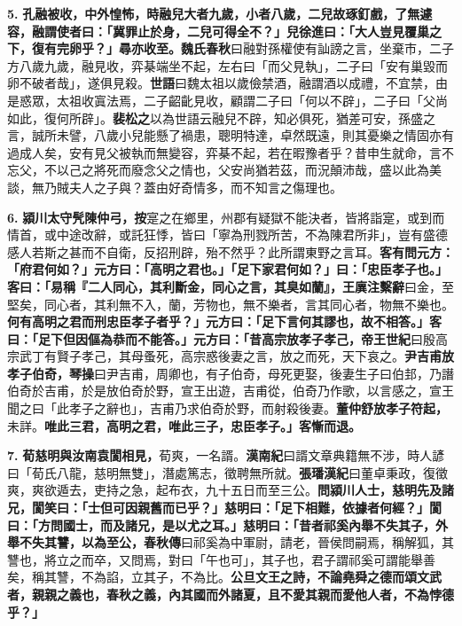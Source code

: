 \textbf{5.} \textbf{孔融被收，中外惶怖，時融兒大者九歲，小者八歲，二兒故琢釘戲，了無遽容，融謂使者曰：「冀罪止於身，二兒可得全不？」兒徐進曰：「大人豈見覆巢之下，復有完卵乎？」尋亦收至。}{\footnotesize \textbf{魏氏春秋}曰融對孫權使有訕謗之言，坐棄市，二子方八歲九歲，融見收，弈棊端坐不起，左右曰「而父見執」，二子曰「安有巢毀而卵不破者哉」，遂俱見殺。\textbf{世語}曰魏太祖以歲儉禁酒，融謂酒以成禮，不宜禁，由是惑眾，太祖收寘法焉，二子齠齔見收，顧謂二子曰「何以不辟」，二子曰「父尚如此，復何所辟」。\textbf{裴松之}以為世語云融兒不辟，知必俱死，猶差可安，孫盛之言，誠所未譬，八歲小兒能懸了禍患，聰明特達，卓然既遠，則其憂樂之情固亦有過成人矣，安有見父被執而無變容，弈棊不起，若在暇豫者乎？昔申生就命，言不忘父，不以己之將死而廢念父之情也，父安尚猶若茲，而況顛沛哉，盛以此為美談，無乃賊夫人之子與？蓋由好奇情多，而不知言之傷理也。}

\textbf{6.} \textbf{潁川太守髠陳仲弓，}{\footnotesize \textbf{按}寔之在鄉里，州郡有疑獄不能決者，皆將詣寔，或到而情首，或中途改辭，或託狂悸，皆曰「寧為刑戮所苦，不為陳君所非」，豈有盛德感人若斯之甚而不自衛，反招刑辟，殆不然乎？此所謂東野之言耳。}\textbf{客有問元方：「府君何如？」元方曰：「高明之君也。」「足下家君何如？」曰：「忠臣孝子也。」客曰：「易稱『二人同心，其利斷金，同心之言，其臭如蘭』，}{\footnotesize \textbf{王廙注繫辭}曰金，至堅矣，同心者，其利無不入，蘭，芳物也，無不樂者，言其同心者，物無不樂也。}\textbf{何有高明之君而刑忠臣孝子者乎？」元方曰：「足下言何其謬也，故不相答。」客曰：「足下但因傴為恭而不能答。」元方曰：「昔高宗放孝子孝己，}{\footnotesize \textbf{帝王世紀}曰殷高宗武丁有賢子孝己，其母蚤死，高宗惑後妻之言，放之而死，天下哀之。}\textbf{尹吉甫放孝子伯奇，}{\footnotesize \textbf{琴操}曰尹吉甫，周卿也，有子伯奇，母死更娶，後妻生子曰伯邽，乃譖伯奇於吉甫，於是放伯奇於野，宣王出遊，吉甫從，伯奇乃作歌，以言感之，宣王聞之曰「此孝子之辭也」，吉甫乃求伯奇於野，而射殺後妻。}\textbf{董仲舒放孝子符起，}{\footnotesize 未詳。}\textbf{唯此三君，高明之君，唯此三子，忠臣孝子。」客慚而退。}

\textbf{7.} \textbf{荀慈明與汝南袁閬相見，}{\footnotesize 荀爽，一名諝。\textbf{漢南紀}曰諝文章典籍無不涉，時人諺曰「荀氏八龍，慈明無雙」，潛處篤志，徵聘無所就。\textbf{張璠漢紀}曰董卓秉政，復徵爽，爽欲遁去，吏持之急，起布衣，九十五日而至三公。}\textbf{問潁川人士，慈明先及諸兄，閬笑曰：「士但可因親舊而已乎？」慈明曰：「足下相難，依據者何經？」閬曰：「方問國士，而及諸兄，是以尤之耳。」慈明曰：「昔者祁奚內舉不失其子，外舉不失其讐，以為至公，}{\footnotesize \textbf{春秋傳}曰祁奚為中軍尉，請老，晉侯問嗣焉，稱解狐，其讐也，將立之而卒，又問焉，對曰「午也可」，其子也，君子謂祁奚可謂能舉善矣，稱其讐，不為諂，立其子，不為比。}\textbf{公旦文王之詩，不論堯舜之德而頌文武者，親親之義也，春秋之義，內其國而外諸夏，且不愛其親而愛他人者，不為悖德乎？」}

